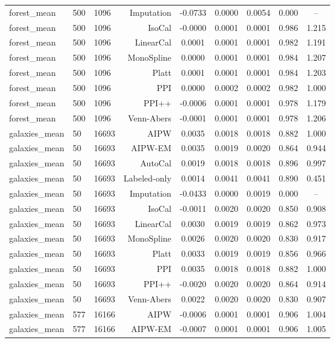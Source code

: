 \begin{tabular}{lllrccccc}
forest\_mean & 500 & 1096 & Imputation & -0.0733 & 0.0000 & 0.0054 & 0.000 & -- \\
forest\_mean & 500 & 1096 & IsoCal & -0.0000 & 0.0001 & 0.0001 & 0.986 & 1.215 \\
forest\_mean & 500 & 1096 & LinearCal & 0.0001 & 0.0001 & 0.0001 & 0.982 & 1.191 \\
forest\_mean & 500 & 1096 & MonoSpline & 0.0000 & 0.0001 & 0.0001 & 0.984 & 1.207 \\
forest\_mean & 500 & 1096 & Platt & 0.0001 & 0.0001 & 0.0001 & 0.984 & 1.203 \\
forest\_mean & 500 & 1096 & PPI & 0.0000 & 0.0002 & 0.0002 & 0.982 & 1.000 \\
forest\_mean & 500 & 1096 & PPI++ & -0.0006 & 0.0001 & 0.0001 & 0.978 & 1.179 \\
forest\_mean & 500 & 1096 & Venn-Abers & -0.0001 & 0.0001 & 0.0001 & 0.978 & 1.206 \\
galaxies\_mean & 50 & 16693 & AIPW & 0.0035 & 0.0018 & 0.0018 & 0.882 & 1.000 \\
galaxies\_mean & 50 & 16693 & AIPW-EM & 0.0035 & 0.0019 & 0.0020 & 0.864 & 0.944 \\
galaxies\_mean & 50 & 16693 & AutoCal & 0.0019 & 0.0018 & 0.0018 & 0.896 & 0.997 \\
galaxies\_mean & 50 & 16693 & Labeled-only & 0.0014 & 0.0041 & 0.0041 & 0.890 & 0.451 \\
galaxies\_mean & 50 & 16693 & Imputation & -0.0433 & 0.0000 & 0.0019 & 0.000 & -- \\
galaxies\_mean & 50 & 16693 & IsoCal & -0.0011 & 0.0020 & 0.0020 & 0.850 & 0.908 \\
galaxies\_mean & 50 & 16693 & LinearCal & 0.0030 & 0.0019 & 0.0019 & 0.862 & 0.973 \\
galaxies\_mean & 50 & 16693 & MonoSpline & 0.0026 & 0.0020 & 0.0020 & 0.830 & 0.917 \\
galaxies\_mean & 50 & 16693 & Platt & 0.0033 & 0.0019 & 0.0019 & 0.856 & 0.966 \\
galaxies\_mean & 50 & 16693 & PPI & 0.0035 & 0.0018 & 0.0018 & 0.882 & 1.000 \\
galaxies\_mean & 50 & 16693 & PPI++ & -0.0020 & 0.0020 & 0.0020 & 0.864 & 0.914 \\
galaxies\_mean & 50 & 16693 & Venn-Abers & 0.0022 & 0.0020 & 0.0020 & 0.830 & 0.907 \\
galaxies\_mean & 577 & 16166 & AIPW & -0.0006 & 0.0001 & 0.0001 & 0.906 & 1.004 \\
galaxies\_mean & 577 & 16166 & AIPW-EM & -0.0007 & 0.0001 & 0.0001 & 0.906 & 1.005 \\

\end{tabular}
